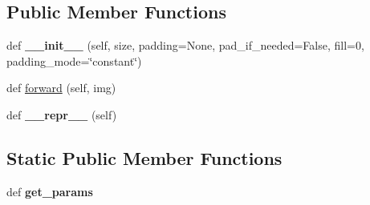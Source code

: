 \subsection*{Public Member Functions}
\begin{DoxyCompactItemize}
\item 
\mbox{\label{classtorchvision_1_1transforms_1_1transforms_1_1RandomCrop_a7380c55809b6638378268cec3898e688}} 
def {\bfseries \+\_\+\+\_\+init\+\_\+\+\_\+} (self, size, padding=None, pad\+\_\+if\+\_\+needed=False, fill=0, padding\+\_\+mode=\char`\"{}constant\char`\"{})
\item 
def \hyperlink{classtorchvision_1_1transforms_1_1transforms_1_1RandomCrop_a3be3e16ad7fe9fb4dfe01721804ec901}{forward} (self, img)
\item 
\mbox{\label{classtorchvision_1_1transforms_1_1transforms_1_1RandomCrop_a76d9bdbd82cd6b84a0f0fc69e1a63fe9}} 
def {\bfseries \+\_\+\+\_\+repr\+\_\+\+\_\+} (self)
\end{DoxyCompactItemize}
\subsection*{Static Public Member Functions}
\begin{DoxyCompactItemize}
\item 
\mbox{\label{classtorchvision_1_1transforms_1_1transforms_1_1RandomCrop_a02be82c9246813000045b38e56edf5cc}} 
def {\bfseries get\+\_\+params}
\end{DoxyCompactItemize}
